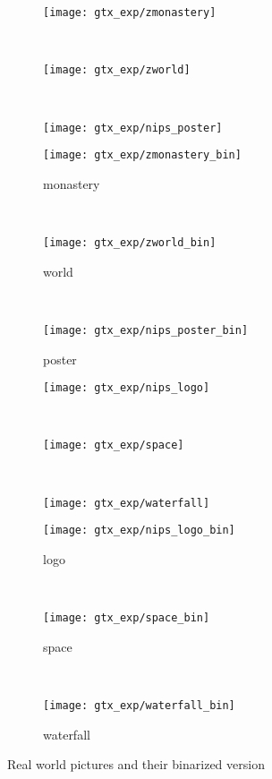 \begin{figure}[t]
	\centering
	\begin{subfigure}[b]{0.32\textwidth}
		\texttt{[image: gtx\_exp/zmonastery]}
	\end{subfigure}~
	\begin{subfigure}[b]{0.32\textwidth}
		\texttt{[image: gtx\_exp/zworld]}
	\end{subfigure}~
	\begin{subfigure}[b]{0.32\textwidth}
		\texttt{[image: gtx\_exp/nips\_poster]}
	\end{subfigure}

	\begin{subfigure}[b]{0.32\textwidth}
		\texttt{[image: gtx\_exp/zmonastery\_bin]}
		\caption{monastery}
	\end{subfigure}~
	\begin{subfigure}[b]{0.32\textwidth}
		\texttt{[image: gtx\_exp/zworld\_bin]}
		\caption{world}
	\end{subfigure}~
	\begin{subfigure}[b]{0.32\textwidth}
		\texttt{[image: gtx\_exp/nips\_poster\_bin]}
		\caption{poster}
	\end{subfigure}

	\begin{subfigure}[b]{0.32\textwidth}
		\texttt{[image: gtx\_exp/nips\_logo]}
	\end{subfigure}~
	\begin{subfigure}[b]{0.32\textwidth}
		\texttt{[image: gtx\_exp/space]}
	\end{subfigure}~
	\begin{subfigure}[b]{0.32\textwidth}
		\texttt{[image: gtx\_exp/waterfall]}
	\end{subfigure}

	\begin{subfigure}[b]{0.32\textwidth}
		\texttt{[image: gtx\_exp/nips\_logo\_bin]}
		\caption{logo}
	\end{subfigure}~
	\begin{subfigure}[b]{0.32\textwidth}
		\texttt{[image: gtx\_exp/space\_bin]}
		\caption{space}
	\end{subfigure}~
	\begin{subfigure}[b]{0.32\textwidth}
		\texttt{[image: gtx\_exp/waterfall\_bin]}
		\caption{waterfall}
	\end{subfigure}
	\caption{Real world pictures and their binarized version}\label{fig:gtx_xp_bwpics}
\end{figure}

